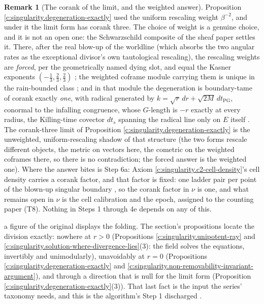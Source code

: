 \documentclass[11pt]{article}
\theoremstyle{definition}
\newtheorem{remark}[theorem]{Remark}
\theoremstyle{plain}
\begin{document}
\begin{remark}[The corank of the limit, and the weighted answer]\label{c:note.singularity.corank-limit-weighted-answer}
Proposition \ref{c:singularity.degeneration-exactly} used the uniform rescaling weight $\beta^{-2}$, and under it the limit form has corank three. The choice of weight is a genuine choice, and it is not an open one: the Schwarzschild composite of the sheaf paper settles it. There, after the real blow-up of the worldline (which absorbs the two angular rates as the exceptional divisor's own tautological rescaling), the rescaling weights are \emph{forced}, per the geometrically named dying slot, and equal the Kasner exponents $(-\tfrac13, \tfrac23, \tfrac23)$ \cite[Thm.~8.16]{ButlerT4}; the weighted coframe module carrying them is unique in the rain-bounded class \cite[Thm.~8.18]{ButlerT4}; and in that module the degeneration is boundary-tame of corank exactly \emph{one}, with radical generated by $k = \sqrt r\,dr + \sqrt{2M}\,dt_{\mathrm{PG}}$, conormal to the infalling congruence, whose $G$-length is $-r$ exactly at every radius, the Killing-time covector $dt_s$ spanning the radical line only on $E$ itself \cite[Thm.~8.7]{ButlerT4}. The corank-three limit of Proposition \ref{c:singularity.degeneration-exactly} is the unweighted, uniform-rescaling shadow of that structure (the two forms rescale different objects, the metric on vectors here, the cometric on the weighted coframes there, so there is no contradiction; the forced answer is the weighted one). Where the answer bites is Step 6a: Axiom \ref{c:singularity.c2-cell-density}'s cell density carries a corank factor, and that factor is fixed: one ladder pair per point of the blown-up singular boundary \cite[\S 8.9]{ButlerT4}, so the corank factor in $\nu$ is one, and what remains open in $\nu$ is the cell calibration and the epoch, assigned to the counting paper (T8). Nothing in Steps 1 through 4e depends on any of this.
\end{remark}

\label{c:note.singularity.setting-where-division-fails-2}
a figure of the original displays the folding. The section's propositions locate the division exactly: nowhere at $r > 0$ (Propositions \ref{c:singularity.unipotent-ray} and \ref{c:singularity.solution-where-divergence-lies}(3): the field solves the equations, invertibly and unimodularly), unavoidably at $r = 0$ (Propositions \ref{c:singularity.degeneration-exactly} and \ref{c:singularity.non-removability-invariant-argument}), and through a direction that is null for the limit form (Proposition \ref{c:singularity.degeneration-exactly}(3)). That last fact is the input the series' taxonomy needs, and this is the algorithm's Step 1 discharged \cite[\S 8.1, Step 1]{ButlerT1}.
\end{document}

